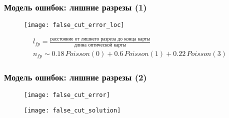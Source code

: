 \begin{frame}
\frametitle{Модель ошибок: лишние разрезы (1)}
\begin{figure}
  \centering
  \texttt{[image: false\_cut\_error\_loc]}
\end{figure}
\begin{gather*}
l_{fp} = \frac{\text{расстояние от лишнего разреза до конца карты}}{\text{длина оптической карты}} \\
n_{fp} \sim 0.18\, Poisson(0) + 0.6 \, Poisson(1) + 0.22 \, Poisson(3)
\end{gather*}

\end{frame}

\begin{frame}
\frametitle{Модель ошибок: лишние разрезы (2)}
\begin{figure}
  \centering
  \texttt{[image: false\_cut\_error]}
\end{figure}
\begin{figure}
  \centering
  \texttt{[image: false\_cut\_solution]}
\end{figure}
\end{frame}
